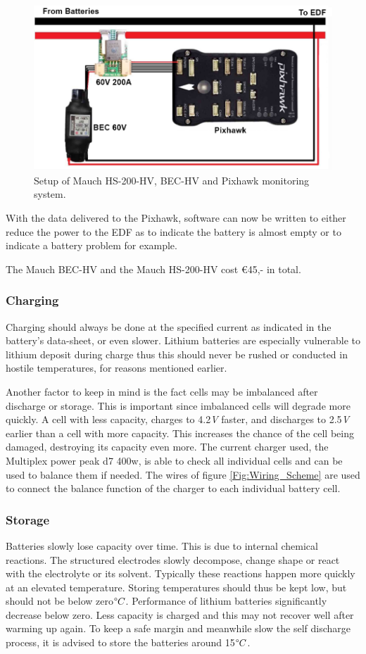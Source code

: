 \begin{figure} [H]
	\centering
	\includegraphics[width=0.5\linewidth]{Figures/BMS.PNG}
	\caption{Setup of Mauch HS-200-HV, BEC-HV and Pixhawk monitoring system.}
   \label{Fig:BMS}
\end{figure}
With the data delivered to the Pixhawk, software can now be written to either reduce the power to the EDF as to indicate the battery is almost empty or to indicate a battery problem for example.

The Mauch BEC-HV\cite{Mauch2} and the Mauch HS-200-HV\cite{Mauch1} cost \euro45,- in total.


\subsubsection{Charging}
Charging should always be done at the specified current as indicated in the battery's data-sheet, or even slower. Lithium batteries are especially vulnerable to lithium deposit during charge thus this should never be rushed or conducted in hostile temperatures, for reasons mentioned earlier.

Another factor to keep in mind is the fact cells may be imbalanced after discharge or storage. This is important since imbalanced cells will degrade more quickly. A cell with less capacity, charges to 4.2\textit{V} faster, and discharges to 2.5\textit{V} earlier than a cell with more capacity. This increases the chance of the cell being damaged, destroying its capacity even more. The current charger used, the Multiplex power peak d7 400w, is able to check all individual cells and can be used to balance them if needed. The wires of figure \ref{Fig:Wiring_Scheme} are used to connect the balance function of the charger to each individual battery cell.

\subsubsection{Storage}
Batteries slowly lose capacity over time. This is due to internal chemical reactions. The structured electrodes slowly decompose, change shape or react with the electrolyte or its solvent. Typically these reactions happen more quickly at an elevated temperature\cite{Keil2016}. Storing temperatures should thus be kept low, but should not be below zero\textit{$\degree C$}. Performance of lithium batteries significantly decrease below zero. Less capacity is charged and this may not recover well after warming up again\cite{Aris2017}. To keep a safe margin and meanwhile slow the self discharge process, it is advised to store the batteries around 15\textit{$\degree C$}. 

